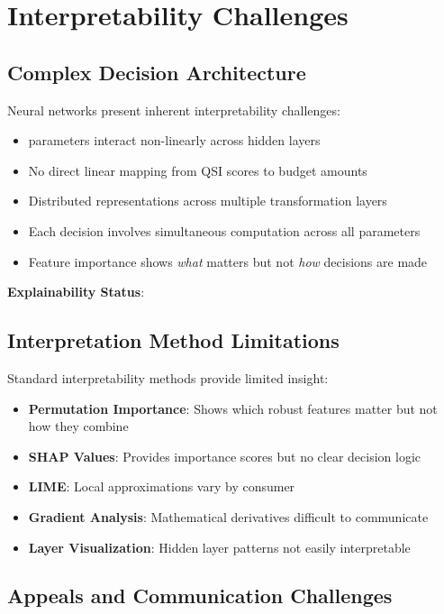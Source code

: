 \section{Interpretability Challenges}

\subsection{Complex Decision Architecture}

Neural networks present inherent interpretability challenges:

\begin{itemize}
    \item \ModelTenTotalParams{} parameters interact non-linearly across \ModelTenHiddenLayers{} hidden layers
    \item No direct linear mapping from QSI scores to budget amounts
    \item Distributed representations across multiple transformation layers
    \item Each decision involves simultaneous computation across all parameters
    \item Feature importance shows \textit{what} matters but not \textit{how} decisions are made
\end{itemize}

\textbf{Explainability Status}: \ModelTenExplainability{}

\subsection{Interpretation Method Limitations}

Standard interpretability methods provide limited insight:

\begin{itemize}
    \item \textbf{Permutation Importance}: Shows which robust features matter but not how they combine
    \item \textbf{SHAP Values}: Provides importance scores but no clear decision logic
    \item \textbf{LIME}: Local approximations vary by consumer
    \item \textbf{Gradient Analysis}: Mathematical derivatives difficult to communicate
    \item \textbf{Layer Visualization}: Hidden layer patterns not easily interpretable
\end{itemize}

\subsection{Appeals and Communication Challenges}

